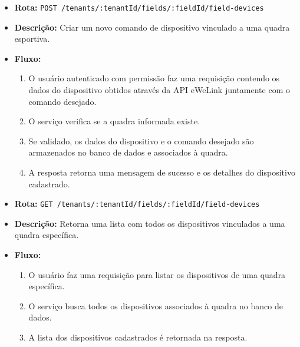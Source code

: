 \begin{itemize}
\item \textbf{Rota:} \texttt{POST /tenants/:tenantId/fields/:fieldId/field-devices}
\item \textbf{Descrição:} Criar um novo comando de dispositivo vinculado a uma quadra esportiva.
\item \textbf{Fluxo:}
\begin{enumerate}
\item O usuário autenticado com permissão faz uma requisição contendo os dados do dispositivo obtidos através da API eWeLink juntamente com o comando desejado.
\item O serviço verifica se a quadra informada existe.
\item Se validado, os dados do dispositivo e o comando desejado são armazenados no banco de dados e associados à quadra.
\item A resposta retorna uma mensagem de sucesso e os detalhes do dispositivo cadastrado.
\end{enumerate}
\end{itemize}

\begin{itemize}
\item \textbf{Rota:} \texttt{GET /tenants/:tenantId/fields/:fieldId/field-devices}
\item \textbf{Descrição:} Retorna uma lista com todos os dispositivos vinculados a uma quadra específica.
\item \textbf{Fluxo:}
\begin{enumerate}
\item O usuário faz uma requisição para listar os dispositivos de uma quadra específica.
\item O serviço busca todos os dispositivos associados à quadra no banco de dados.
\item A lista dos dispositivos cadastrados é retornada na resposta.
\end{enumerate}
\end{itemize}

